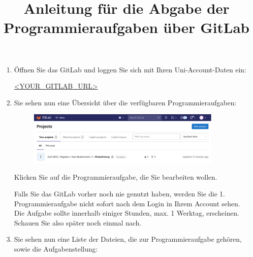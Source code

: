 \documentclass{scrartcl}
\title{\vspace{-2cm}Anleitung für die Abgabe der Programmieraufgaben über GitLab}
\begin{document}
	\maketitle
	
	\begin{enumerate}
		\item Öffnen Sie das GitLab und loggen Sie sich mit Ihren Uni-Account-Daten ein:
		
		\vfill
		
		\url{<YOUR_GITLAB_URL>} %
		
		\vfill
	
		\item Sie sehen nun eine Übersicht über die verfügbaren Programmieraufgaben:
		
		\vfill
		
		\begin{figure}[h!]
			\centering
			\includegraphics[width=0.9\textwidth]{img/screenshot-project-overview.png}
		\end{figure}
		
		\vfill

		Klicken Sie auf die Programmieraufgabe, die Sie bearbeiten wollen.
		
		\vfill

		\begin{tcolorbox}[title=\faLightbulbO\space Hinweis,colbacktitle=hintboxcolor,colframe=hintboxcolor]
			Falls Sie das GitLab vorher noch nie genutzt haben, werden Sie die 1. Programmieraufgabe nicht sofort nach dem Login in Ihrem Account sehen. Die Aufgabe sollte innerhalb einiger Stunden, max. 1 Werktag, erscheinen. Schauen Sie also später noch einmal nach.
		\end{tcolorbox}
		
		\vspace{6cm}
		
		\newpage
		
		\item Sie sehen nun eine Liste der Dateien, die zur Programmieraufgabe gehören, sowie die Aufgabenstellung:
		
		\vfill
		

\end{enumerate}
\end{document}

